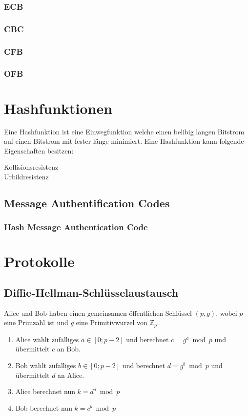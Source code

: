 \documentclass[8pt,a4paper,landscape]{article}
\newcommand{\Z}[1]{\ensuremath{\mathbb{Z}_{#1}}}
\begin{document}
\begin{multicols*}{4}
 \subsubsection{ECB}
 \subsubsection{CBC}
 \subsubsection{CFB}
 \subsubsection{OFB}
 
 \section{Hashfunktionen}
 Eine Hashfunktion ist eine Einwegfunktion welche einen belibig langen Bitstrom
 auf einen Bitstrom mit fester länge minimiert.
 Eine Hashfunktion kann folgende Eigenschaften besitzen:
 \begin{description}
  \item[Kollisionsresistenz]
  \item[Urbildresistenz]
 \end{description}
 
 \subsection{Message Authentification Codes}
 \subsubsection{Hash Message Authentication Code}

 
 \section{Protokolle}
 \subsection{Diffie-Hellman-Schlüsselaustausch}
 Alice und Bob haben einen gemeinsamen öffentlichen Schlüssel $(p,g)$, wobei
 $p$ eine Primzahl ist und $g$ eine Primitivwurzel von \Z{p}.
 \begin{enumerate}
  \item Alice wählt zufälliges $a \in [0;p-2]$ und berechnet $c = g^a \bmod p$
  und übermittelt $c$ an Bob.
  \item Bob wählt zufälliges $b \in [0;p-2]$ und berechnet $d = g^b \bmod p$
  und übermittelt $d$ an Alice.
  \item Alice berechnet nun $k = d^a \bmod p$
  \item Bob berechnet nun $k = c^b \bmod p$
 \end{enumerate}
 

\end{multicols*}
\end{document}
